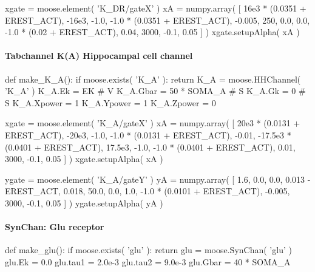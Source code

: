 \documentclass[]{article}%
\begin{document}
  xgate = moose.element( 'K_DR/gateX' )
  xA = numpy.array( [ 16e3 * (0.0351 + EREST_ACT), 
    -16e3, -1.0, -1.0 * (0.0351 + EREST_ACT), -0.005,
    250, 0.0, 0.0, -1.0 * (0.02 + EREST_ACT), 0.04,
    3000, -0.1, 0.05 ] )
  xgate.setupAlpha( xA )
\nwendcode{}\nwdocspar


\paragraph{Tabchannel K(A) Hippocampal cell channel}

\nwenddocs{}\endmoddef\nwstartdeflinemarkup{}\nwenddeflinemarkup
def make_K_A():
  if moose.exists( 'K_A' ):
    return
  K_A = moose.HHChannel( 'K_A' )
  K_A.Ek = EK        #  V
  K_A.Gbar = 50 * SOMA_A  #  S
  K_A.Gk = 0        #  S
  K_A.Xpower = 1
  K_A.Ypower = 1
  K_A.Zpower = 0

  xgate = moose.element( 'K_A/gateX' )
  xA = numpy.array( [ 20e3 * (0.0131 + EREST_ACT), 
    -20e3, -1.0, -1.0 * (0.0131 + EREST_ACT), -0.01,
    -17.5e3 * (0.0401 + EREST_ACT), 
    17.5e3, -1.0, -1.0 * (0.0401 + EREST_ACT), 0.01,
    3000, -0.1, 0.05 ] )
  xgate.setupAlpha( xA )

  ygate = moose.element( 'K_A/gateY' )
  yA = numpy.array( [ 1.6, 0.0, 0.0, 0.013 - EREST_ACT, 0.018,
    50.0, 0.0, 1.0, -1.0 * (0.0101 + EREST_ACT), -0.005,
    3000, -0.1, 0.05 ] )
  ygate.setupAlpha( yA )
\eatline
{}\nwendcode{}\nwdocspar
\paragraph{SynChan: Glu receptor}

\nwenddocs{}\endmoddef\nwstartdeflinemarkup{}\nwenddeflinemarkup
def make_glu():
  if moose.exists( 'glu' ):
    return
  glu = moose.SynChan( 'glu' )
  glu.Ek = 0.0
  glu.tau1 = 2.0e-3
  glu.tau2 = 9.0e-3
  glu.Gbar = 40 * SOMA_A
\eatline
{}\nwendcode{}\nwdocspar
\end{document}

